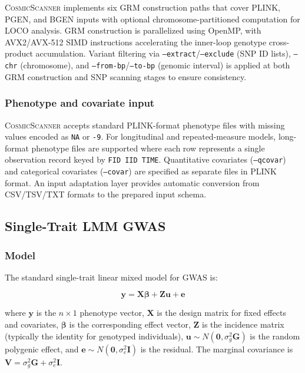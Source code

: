 \documentclass[11pt,a4paper]{article}
\newcommand{\CosmicScanner}{\textsc{CosmicScanner}}
\begin{document}
\CosmicScanner{} implements six GRM construction paths that cover PLINK, PGEN, and BGEN inputs with optional chromosome-partitioned computation for LOCO analysis. GRM construction is parallelized using OpenMP, with AVX2/AVX-512 SIMD instructions accelerating the inner-loop genotype cross-product accumulation. Variant filtering via \texttt{--extract}/\texttt{--exclude} (SNP ID lists), \texttt{--chr} (chromosome), and \texttt{--from-bp}/\texttt{--to-bp} (genomic interval) is applied at both GRM construction and SNP scanning stages to ensure consistency.

\subsubsection{Phenotype and covariate input}

\CosmicScanner{} accepts standard PLINK-format phenotype files with missing values encoded as \texttt{NA} or \texttt{-9}. For longitudinal and repeated-measure models, long-format phenotype files are supported where each row represents a single observation record keyed by \texttt{FID IID TIME}. Quantitative covariates (\texttt{--qcovar}) and categorical covariates (\texttt{--covar}) are specified as separate files in PLINK format. An input adaptation layer provides automatic conversion from CSV/TSV/TXT formats to the prepared input schema.

\subsection{Single-Trait LMM GWAS}

\subsubsection{Model}

The standard single-trait linear mixed model for GWAS is:

\begin{equation}
\mathbf{y} = \mathbf{X}\boldsymbol{\beta} + \mathbf{Z}\mathbf{u} + \mathbf{e}
\label{eq:lmm}
\end{equation}

where $\mathbf{y}$ is the $n \times 1$ phenotype vector, $\mathbf{X}$ is the design matrix for fixed effects and covariates, $\boldsymbol{\beta}$ is the corresponding effect vector, $\mathbf{Z}$ is the incidence matrix (typically the identity for genotyped individuals), $\mathbf{u} \sim N(\mathbf{0}, \sigma_g^2 \mathbf{G})$ is the random polygenic effect, and $\mathbf{e} \sim N(\mathbf{0}, \sigma_e^2 \mathbf{I})$ is the residual. The marginal covariance is $\mathbf{V} = \sigma_g^2 \mathbf{G} + \sigma_e^2 \mathbf{I}$.
\end{document}
